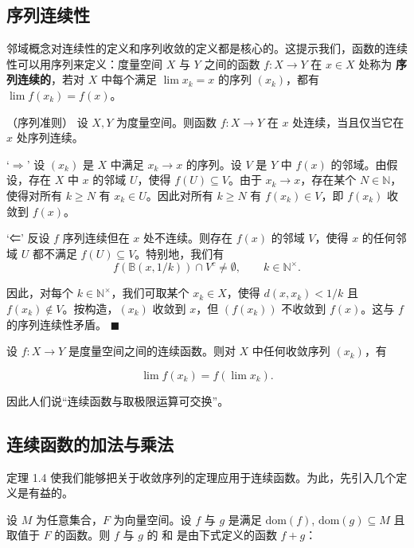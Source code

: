 \subsection*{序列连续性}

邻域概念对连续性的定义和序列收敛的定义都是核心的。这提示我们，函数的连续性可以用序列来定义：度量空间 $ X $ 与 $ Y $ 之间的函数 $ f: X \to Y $ 在 $ x \in X $ 处称为 \textbf{序列连续的}，若对 $ X $ 中每个满足 $ \lim x_k = x $ 的序列 $ (x_k) $，都有 $ \lim f(x_k) = f(x) $。

\begin{theorem}

（序列准则） 设 $X, Y$ 为度量空间。则函数 $f: X \to Y$ 在 $x$ 处连续，当且仅当它在 $x$ 处序列连续。

\proofhead
‘$\Rightarrow$’ 设 $(x_k)$ 是 $X$ 中满足 $x_k \to x$ 的序列。设 $V$ 是 $Y$ 中 $f(x)$ 的邻域。由假设，存在 $X$ 中 $x$ 的邻域 $U$，使得 $f(U) \subseteq V$。由于 $x_k \to x$，存在某个 $N \in \mathbb{N}$，使得对所有 $k \geq N$ 有 $x_k \in U$。因此对所有 $k \geq N$ 有 $f(x_k) \in V$，即 $f(x_k)$ 收敛到 $f(x)$。

‘⇐’ 反设 $f$ 序列连续但在 $x$ 处不连续。则存在 $f(x)$ 的邻域 $V$，使得 $x$ 的任何邻域 $U$ 都不满足 $f(U) \subseteq V$。特别地，我们有
\[
f\left(\mathbb{B}(x,1/k)\right)\cap V^{c}\neq\emptyset,\qquad k\in\mathbb{N}^{\times}.
\]

因此，对每个 $ k \in \mathbb{N}^\times $，我们可取某个 $ x_k \in X $，使得 $ d(x, x_k) < 1/k $ 且 $ f(x_k) \notin V $。按构造，$ (x_k) $ 收敛到 $ x $，但 $ (f(x_k)) $ 不收敛到 $ f(x) $。这与 $ f $ 的序列连续性矛盾。 $ \blacksquare $

\end{theorem}

设 $f: X \to Y$ 是度量空间之间的连续函数。则对 $X$ 中任何收敛序列 $(x_{k})$，有

\[
\lim f(x_{k})=f(\lim x_{k}).
\]

因此人们说“连续函数与取极限运算可交换”。

\subsection*{连续函数的加法与乘法}

定理 1.4 使我们能够把关于收敛序列的定理应用于连续函数。为此，先引入几个定义是有益的。

设 $M$ 为任意集合，$F$ 为向量空间。设 $f$ 与 $g$ 是满足 $\mathrm{dom}(f)$, $\mathrm{dom}(g) \subseteq M$ 且取值于 $F$ 的函数。则 $f$ 与 $g$ 的 $\text{和}$ 是由下式定义的函数 $f + g$：

